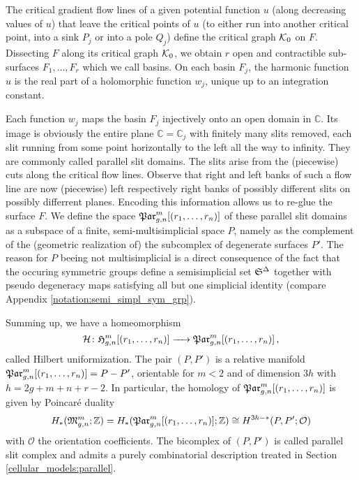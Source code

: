 The critical gradient flow lines of a given potential function $u$ (along decreasing values of $u$) that leave the critical points of $u$
(to either run into another critical point, into a sink $P_j$ or into a pole $Q_j$) define the critical graph $\mathcal{K}_0$ on $F$.
Dissecting $F$ along its critical graph $\mathcal{K}_0$, we obtain $r$ open and contractible sub-surfaces $F_1, \ldots, F_r$ which we call basins.
On each basin $F_j$, the harmonic function $u$ is the real part of a holomorphic function $w_j$, unique up to an integration constant.

Each function $w_j$ maps the basin $F_j$ injectively onto an open domain in $\mathbb C$.
Its image is obviously the entire plane $\mathbb C = \mathbb C_j$ with finitely many slits removed,
each slit running from some point horizontally to the left all the way to infinity.
They are commonly called parallel slit domains.
The slits arise from the (piecewise) cuts along the critical flow lines.
Observe that right and left banks of such a flow line are now (piecewise) left respectively right banks of possibly different slits on possibly differrent planes.
Encoding this information allows us to re-glue the surface $F$. 
We define the space $\Parr$ of these parallel slit domains as a subspace of a finite, semi-multisimplicial space $P$,
namely as the complement of the (geometric realization of) the subcomplex of degenerate surfaces $P'$.
The reason for $P$ beeing not multisimplicial is a direct consequence of the fact that the occuring symmetric groups define a semisimplicial set $\mathfrak S^\Delta$
together with pseudo degeneracy maps satisfying all but one simplicial identity (compare Appendix \ref{notation:semi_simpl_sym_grp}).

Summing up, we have a homeomorphism
\[
    \mc H \colon \Harmr \to \Parr \,,
\]
called Hilbert uniformization.
The pair $(P,P')$ is a relative manifold $\Parr = P - P'$, orientable for $m < 2$ and of dimension $3h$ with $h = 2g+m+n+r-2$.
In particular, the homology of $\Parr$ is given by Poincaré duality
\[
    H_\ast( \Modspc; \mathbb Z ) = H_\ast( \Parr; \mathbb Z ) \cong H^{3h-\ast}( P, P'; \mathcal O)
\]
with $\mathcal O$ the orientation coefficients.
The bicomplex of $(P,P')$ is called parallel slit complex and admits a purely combinatorial description treated in Section \ref{cellular_models:parallel}. 

